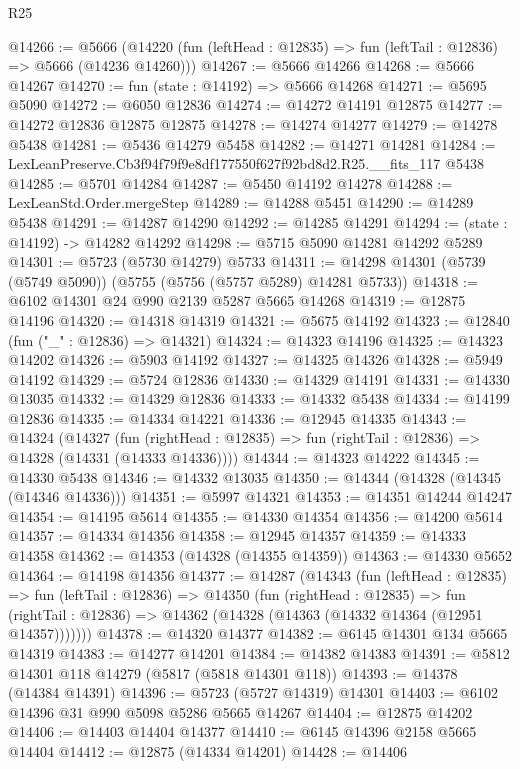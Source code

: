 \begin{lexlean}{R25}
\begin{coremodule}
@14266 := @5666
    (@14220 (fun (leftHead : @12835) => fun (leftTail : @12836) => @5666 (@14236 @14260)))
@14267 := @5666 @14266
@14268 := @5666 @14267
@14270 := fun (state : @14192) => @5666 @14268
@14271 := @5695 @5090
@14272 := @6050 @12836
@14274 := @14272 @14191 @12875
@14277 := @14272 @12836 @12875 @12875
@14278 := @14274 @14277
@14279 := @14278 @5438
@14281 := @5436 @14279 @5458
@14282 := @14271 @14281
@14284 := LexLeanPreserve.Cb3f94f79f9e8df177550f627f92bd8d2.R25.__fits_117 @5438
@14285 := @5701 @14284
@14287 := @5450 @14192 @14278
@14288 := LexLeanStd.Order.mergeStep
@14289 := @14288 @5451
@14290 := @14289 @5438
@14291 := @14287 @14290
@14292 := @14285 @14291
@14294 := (state : @14192) -> @14282 @14292
@14298 := @5715 @5090 @14281 @14292 @5289
@14301 := @5723 (@5730 @14279) @5733
@14311 := @14298 @14301 (@5739 (@5749 @5090)) (@5755 (@5756 (@5757 @5289) @14281 @5733))
@14318 := @6102 @14301 @24 @990 @2139 @5287 @5665 @14268
@14319 := @12875 @14196
@14320 := @14318 @14319
@14321 := @5675 @14192
@14323 := @12840 (fun ("_" : @12836) => @14321)
@14324 := @14323 @14196
@14325 := @14323 @14202
@14326 := @5903 @14192
@14327 := @14325 @14326
@14328 := @5949 @14192
@14329 := @5724 @12836
@14330 := @14329 @14191
@14331 := @14330 @13035
@14332 := @14329 @12836
@14333 := @14332 @5438
@14334 := @14199 @12836
@14335 := @14334 @14221
@14336 := @12945 @14335
@14343 := @14324
    (@14327
      (fun (rightHead : @12835) => fun (rightTail : @12836) => @14328 (@14331 (@14333 @14336))))
@14344 := @14323 @14222
@14345 := @14330 @5438
@14346 := @14332 @13035
@14350 := @14344 (@14328 (@14345 (@14346 @14336)))
@14351 := @5997 @14321
@14353 := @14351 @14244 @14247
@14354 := @14195 @5614
@14355 := @14330 @14354
@14356 := @14200 @5614
@14357 := @14334 @14356
@14358 := @12945 @14357
@14359 := @14333 @14358
@14362 := @14353 (@14328 (@14355 @14359))
@14363 := @14330 @5652
@14364 := @14198 @14356
@14377 := @14287
    (@14343
      (fun (leftHead : @12835) =>
      fun (leftTail : @12836) =>
      @14350
        (fun (rightHead : @12835) =>
        fun (rightTail : @12836) => @14362 (@14328 (@14363 (@14332 @14364 (@12951 @14357)))))))
@14378 := @14320 @14377
@14382 := @6145 @14301 @134 @5665 @14319
@14383 := @14277 @14201
@14384 := @14382 @14383
@14391 := @5812 @14301 @118 @14279 (@5817 (@5818 @14301 @118))
@14393 := @14378 (@14384 @14391)
@14396 := @5723 (@5727 @14319) @14301
@14403 := @6102 @14396 @31 @990 @5098 @5286 @5665 @14267
@14404 := @12875 @14202
@14406 := @14403 @14404 @14377
@14410 := @6145 @14396 @2158 @5665 @14404
@14412 := @12875 (@14334 @14201)
@14428 := @14406

\end{coremodule}
\end{lexlean}
